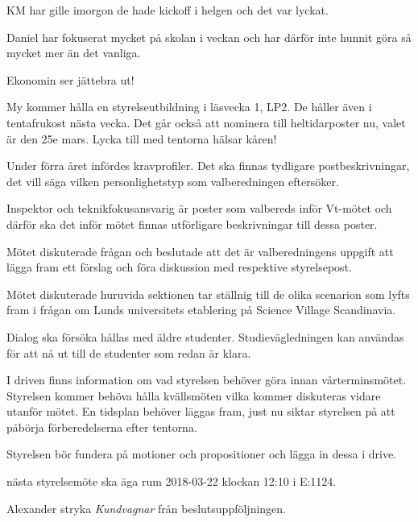\documentclass[10pt]{article}
\begin{document}
\begin{paragrafer}
\begin{paragrafer}
KM har gille imorgon de hade kickoff i helgen och det var lyckat.

Daniel har fokuserat mycket på skolan i veckan och har därför inte hunnit göra så mycket mer än det vanliga.

  Ekonomin ser jättebra ut!


  My kommer hålla en styrelseutbildning i läsvecka 1, LP2. De håller även i tentafrukost nästa vecka. Det går också att nominera till heltidarposter nu, valet är den 25e mars.
  Lycka till med tentorna hälsar kåren!

\end{paragrafer}

  Under förra året infördes kravprofiler. Det ska finnas tydligare postbeskrivningar, det vill säga vilken personlighetstyp som valberedningen eftersöker.

  Inspektor och teknikfokusansvarig är poster som valbereds inför Vt-mötet och därför ska det inför mötet finnas utförligare beskrivningar till dessa poster.

  Mötet diskuterade frågan och beslutade att det är valberedningens uppgift att lägga fram ett förslag och föra diskussion med respektive styrelsepost.


  Mötet diskuterade huruvida sektionen tar ställnig till de olika scenarion som lyfts fram i frågan om Lunds universitets etablering på Science Village Scandinavia.

  Dialog ska försöka hållas med äldre studenter. Studievägledningen kan användas för att nå ut till de studenter som redan är klara.


  I driven finns information om vad styrelsen behöver göra innan vårterminsmötet. Styrelsen kommer behöva hålla kvällsmöten vilka kommer diskuteras vidare utanför mötet.
  En tidsplan behöver läggas fram, just nu siktar styrelsen på att påbörja förberedelserna efter tentorna.

  Styrelsen bör fundera på motioner och propositioner och lägga in dessa i drive.

\Mba nästa styrelsemöte ska äga rum 2018-03-22 klockan 12:10 i E:1124.


  Alexander \ypa stryka \emph{Kundvagnar} från beslutsuppföljningen.
\Mbaby



\end{paragrafer}
\end{document}
